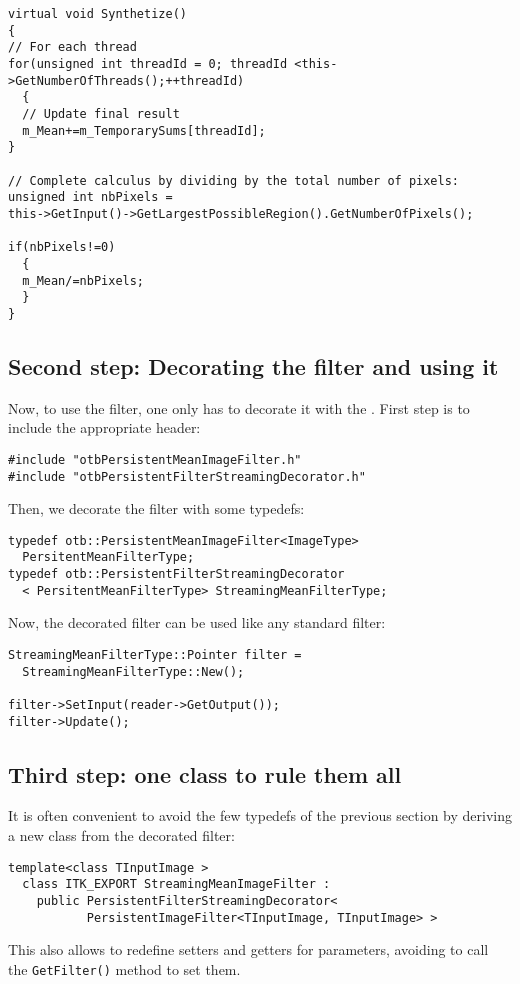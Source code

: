 \begin{lstlisting}
virtual void Synthetize()
{
// For each thread
for(unsigned int threadId = 0; threadId <this->GetNumberOfThreads();++threadId)
  {
  // Update final result
  m_Mean+=m_TemporarySums[threadId];
} 

// Complete calculus by dividing by the total number of pixels:
unsigned int nbPixels =
this->GetInput()->GetLargestPossibleRegion().GetNumberOfPixels();

if(nbPixels!=0)
  {
  m_Mean/=nbPixels;
  }  
}
\end{lstlisting}

\subsection{Second step: Decorating the filter and using it}

Now, to use the filter, one only has to decorate it with the
. First step is
to include the appropriate header:

\begin{lstlisting}
#include "otbPersistentMeanImageFilter.h"
#include "otbPersistentFilterStreamingDecorator.h"
\end{lstlisting}

Then, we decorate the filter with some typedefs:

\begin{lstlisting}
typedef otb::PersistentMeanImageFilter<ImageType>
  PersitentMeanFilterType;
typedef otb::PersistentFilterStreamingDecorator
  < PersitentMeanFilterType> StreamingMeanFilterType;
\end{lstlisting}

Now, the decorated filter can be used like any standard filter:

\begin{lstlisting}
StreamingMeanFilterType::Pointer filter =
  StreamingMeanFilterType::New();

filter->SetInput(reader->GetOutput());
filter->Update();
\end{lstlisting}

\subsection{Third step: one class to rule them all}

It is often convenient to avoid the few typedefs of the previous
section by deriving a new class from the decorated filter:

\begin{lstlisting}
template<class TInputImage >
  class ITK_EXPORT StreamingMeanImageFilter :
    public PersistentFilterStreamingDecorator<
           PersistentImageFilter<TInputImage, TInputImage> >
\end{lstlisting}

This also allows to redefine setters and getters for parameters,
avoiding to call the \verb?GetFilter()? method to set them.
